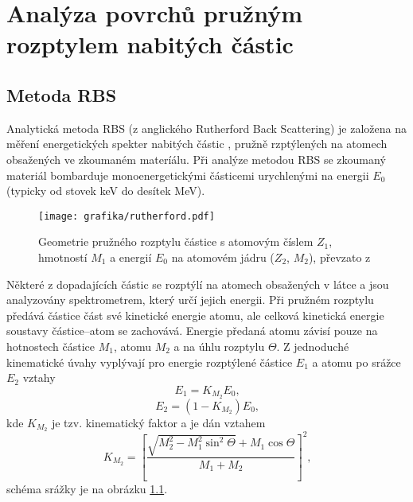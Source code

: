 \chapter{Analýza povrchů pružným rozptylem nabitých částic}
\section{Metoda RBS}
Analytická metoda RBS (z anglického Rutherford Back Scattering) je založena na měření energetických spekter nabitých částic , pružně rzptýlených na atomech obsažených ve zkoumaném materíálu. 
Při analýze metodou RBS se zkoumaný materiál bombarduje monoenergetickými částicemi urychlenými na energii $E_0$ (typicky od stovek keV do desítek MeV). 

\begin{figure}[bthp]
  \centering
  \texttt{[image: grafika/rutherford.pdf]}
  \caption{Geometrie pružného rozptylu částice s atomovým číslem $Z_1$, hmotností $M_1$ a energií $E_0$ na atomovém jádru ($Z_2$, $M_2$), převzato z \cite{Kral2002}}
  \label{rutherford}
\end{figure}

Některé z dopadajících částic se rozptýlí na atomech obsažených v látce a jsou analyzovány spektrometrem, který určí jejich energii. Při pružném rozptylu předává částice část své kinetické energie atomu, ale celková kinetická energie soustavy částice--atom se zachovává. Energie předaná atomu závisí pouze na hotnostech částice $M_1$, atomu $M_2$ a na úhlu rozptylu $\Theta$. Z jednoduché kinematické úvahy vyplývají pro energie rozptýlené částice $E_1$ a atomu po srážce $E_2$ vztahy
%
\begin{equation}
E_1 = K_{M_2} E_0 \text{,}
\end{equation}
\begin{equation}
E_2 = (1 - K_{M_2}) E_0 \text{,}
\end{equation}  
%
kde $K_{M_2}$ je tzv. kinematický faktor a je dán vztahem
\begin{equation}
K_{M_2} = \left[ \frac{\sqrt{M_2^2 - M_1^2\sin^2\Theta} + M_1 \cos\Theta}{M_1 + M_2} \right]^2 \text{,}
\end{equation}
schéma srážky je na obrázku \ref{rutherford}.

